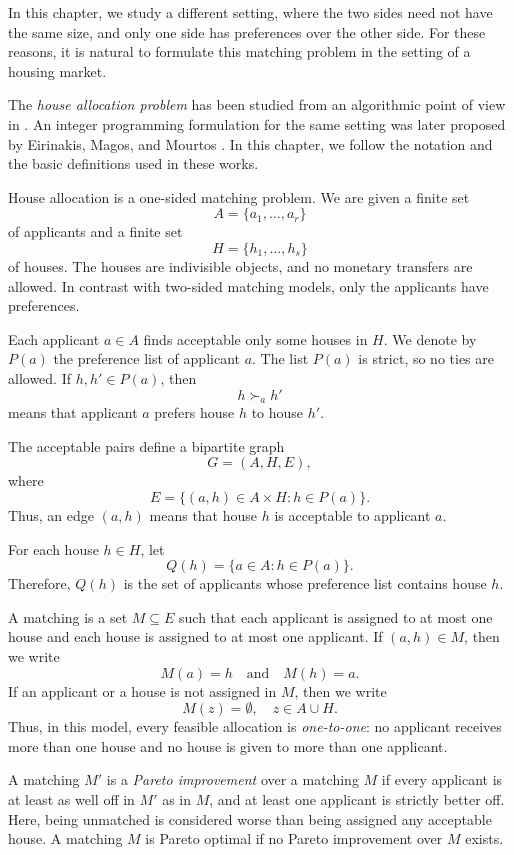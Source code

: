 \documentclass[12pt]{report}
\numberwithin{algorithm}{chapter}
\begin{document}
	In this chapter, we study a different setting, where the two sides need not have the same size, and only one side has preferences over the other side. For these reasons, it is natural to formulate this matching problem in the setting of a housing market.
	
	The \emph{house allocation problem} has been studied from an algorithmic point of view in \cite{abraham2004pareto}. An integer programming formulation for the same setting was later proposed by Eirinakis, Magos, and Mourtos \cite{eirinakis2015model}. In this chapter, we follow the notation and the basic definitions used in these works.
	
	House allocation is a one-sided matching problem. We are given a finite set
	\[
	A=\{a_1,\ldots,a_r\}
	\]
	of applicants and a finite set
	\[
	H=\{h_1,\ldots,h_s\}
	\]
	of houses. The houses are indivisible objects, and no monetary transfers are allowed. 
	In contrast with two-sided matching models, only the applicants have preferences.
	
	Each applicant $a\in A$ finds acceptable only some houses in $H$. We denote by
	$P(a)$ the preference list of applicant $a$. The list $P(a)$ is strict, so no ties are
	allowed. If $h,h'\in P(a)$, then
	\[
	h \succ_{a} h'
	\]
	means that applicant $a$ prefers house $h$ to house $h'$.
	
	The acceptable pairs define a bipartite graph
	\[
	G=(A,H,E),
	\]
	where
	\[
	E=\{(a,h)\in A\times H: h\in P(a)\}.
	\]
	Thus, an edge $(a,h)$ means that house $h$ is acceptable to applicant $a$.
	
	For each house \(h\in H\), let
	\[
	Q(h)=\{a\in A: h\in P(a)\}.
	\]
	Therefore, $Q(h)$ is the set of applicants whose preference list contains house $h$.
	
	A matching is a set $M\subseteq E$ such that each applicant is assigned to at most
	one house and each house is assigned to at most one applicant. If $(a,h)\in M$,
	then we write
	\[
	M(a)=h
	\quad\text{and}\quad
	M(h)=a.
	\]
	If an applicant or a house is not assigned in $M$, then we write
	\[
	M(z)=\emptyset,
	\quad z\in A\cup H.
	\]
	Thus, in this model, every feasible allocation is \emph{one-to-one}: no applicant receives
	more than one house and no house is given to more than one applicant.
	
	A matching $M'$ is a \emph{Pareto improvement} over a matching $M$ if every applicant
	is at least as well off in $M'$ as in $M$, and at least one applicant is strictly better
	off. Here, being unmatched is considered worse than being assigned any acceptable
	house. A matching $M$ is Pareto optimal if no Pareto improvement over $M$
	exists.
	
\end{document}
